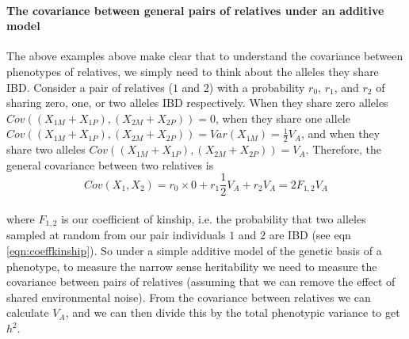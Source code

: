 


\paragraph{The covariance between general pairs of relatives under an
additive model}

The above examples above make clear that to understand the covariance between
phenotypes of relatives, we simply need to think about the alleles they
share IBD. Consider a pair of relatives ($1$ and $2$) with a probability $r_0$,
$r_1$, and $r_2$ of sharing zero, one, or two alleles IBD
respectively. When they share zero alleles
$Cov((X_{1M}+X_{1P}),(X_{2M}+X_{2P}))=0$, when they share one allele
$Cov((X_{1M}+X_{1P}),(X_{2M}+X_{2P}))=
Var(X_{1M})=\frac{1}{2}V_A$, and when they share two alleles $Cov((X_{1M}+X_{1P}),(X_{2M}+X_{2P}))=
V_A$. Therefore, the general covariance between two
relatives is
\begin{equation}
Cov(X_1,X_2) = r_0 \times 0 + r_1 \frac{1}{2}V_A + r_2  V_A =
2 F_{1,2} V_A  \label{additive_covar_general_rellys}
\end{equation}\\
where $F_{1,2}$ is our coefficient of kinship, i.e. the probability that two alleles sampled at random
from our pair
individuals $1$ and $2$ are IBD (see eqn \eqref{eqn:coeffkinship}).
So under a simple additive model of the genetic basis of a phenotype,
to measure the narrow sense heritability we need to measure the
covariance between pairs of relatives (assuming that we can remove the effect of
shared environmental noise). From the covariance between relatives we
can calculate $V_A$, and we can then divide this by the total phenotypic
variance to get $h^2$. \\

